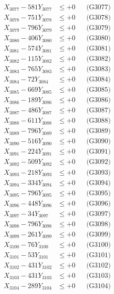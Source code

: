 \documentclass[a4paper,10pt]{article}
\begin{document}
{\begin{align}
X_{3077} - 581Y_{3077} &\leq +0 && \text{(G3077)} \\
X_{3078} - 751Y_{3078} &\leq +0 && \text{(G3078)} \\
X_{3079} - 796Y_{3079} &\leq +0 && \text{(G3079)} \\
X_{3080} - 406Y_{3080} &\leq +0 && \text{(G3080)} \\
\allowbreak
X_{3081} - 574Y_{3081} &\leq +0 && \text{(G3081)} \\
X_{3082} - 115Y_{3082} &\leq +0 && \text{(G3082)} \\
X_{3083} - 765Y_{3083} &\leq +0 && \text{(G3083)} \\
X_{3084} - 72Y_{3084} &\leq +0 && \text{(G3084)} \\
X_{3085} - 669Y_{3085} &\leq +0 && \text{(G3085)} \\
X_{3086} - 189Y_{3086} &\leq +0 && \text{(G3086)} \\
X_{3087} - 486Y_{3087} &\leq +0 && \text{(G3087)} \\
X_{3088} - 611Y_{3088} &\leq +0 && \text{(G3088)} \\
X_{3089} - 796Y_{3089} &\leq +0 && \text{(G3089)} \\
X_{3090} - 516Y_{3090} &\leq +0 && \text{(G3090)} \\
\allowbreak
X_{3091} - 224Y_{3091} &\leq +0 && \text{(G3091)} \\
X_{3092} - 509Y_{3092} &\leq +0 && \text{(G3092)} \\
X_{3093} - 218Y_{3093} &\leq +0 && \text{(G3093)} \\
X_{3094} - 334Y_{3094} &\leq +0 && \text{(G3094)} \\
X_{3095} - 796Y_{3095} &\leq +0 && \text{(G3095)} \\
X_{3096} - 448Y_{3096} &\leq +0 && \text{(G3096)} \\
X_{3097} - 34Y_{3097} &\leq +0 && \text{(G3097)} \\
X_{3098} - 796Y_{3098} &\leq +0 && \text{(G3098)} \\
X_{3099} - 261Y_{3099} &\leq +0 && \text{(G3099)} \\
X_{3100} - 76Y_{3100} &\leq +0 && \text{(G3100)} \\
\allowbreak
X_{3101} - 53Y_{3101} &\leq +0 && \text{(G3101)} \\
X_{3102} - 431Y_{3102} &\leq +0 && \text{(G3102)} \\
X_{3103} - 431Y_{3103} &\leq +0 && \text{(G3103)} \\
X_{3104} - 289Y_{3104} &\leq +0 && \text{(G3104)} \\

\end{align}}
\end{document}
